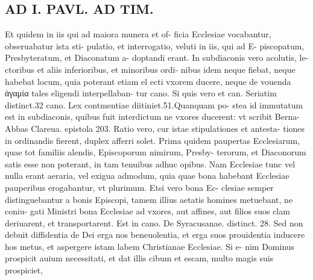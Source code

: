 \documentclass{article}
\begin{document}
\begin{pages}
\section*{AD I. PAVL. AD TIM. }
\marginpar{[ p.114 ]}\pstart Et quidem in iis qui ad maiora munera et of- ficia Ecclesiae vocabantur, obseruabatur ista sti- pulatio, et interrogatio, veluti in iis, qui ad E- piscopatum, Presbyteratum, et Diaconatum a- doptandi erant. In subdiaconis vero acolutis, le- ctoribus et aliis inferioribus, et minoribus ordi- nibus idem neque fiebat, neque habebat locum, quia poterant etiam el ecti vxorem ducere, neque de vouenda ἀγαμία tales eligendi interpellaban- tur cano. Si quis vero et can. Seriatim distinct.32 cano. Lex contmentiae diitiniet.51.Quanquam po- stea id immutatum est in subdiaconis, quibus fuit interdictum ne vxores ducerent: vt scribit Berna- Abbas Clareua. epistola 203.  \pend\pstart Ratio vero, cur istae stipulationes et antesta- tiones in ordinandis fierent, duplex afferri solet. Prima quidem paupertas Ecclesiarum, quae tot familiis alendis, Episcoporum nimirum, Presby- terorum, et Diaconorum satis esse non poterant, in tam tenuibus adhuc opibus. Nam Ecclesiae tunc vel nulla erant aeraria, vel exigua admodum, quia quae bona habebant Ecclesiae pauperibus erogabantur, vt plurimum. Etsi vero bona Ec- clesiae semper distinguebantur a bonis Episcopi, tamem illius aetatis homines metuebant, ne coniu- gati Ministri bona Ecclesiae ad vxores, aut affines, aut filios suos clam deriuarent, et transportarent. Est in cano. De Syracusanae. distinct. 28. Sed non debuit diffidentia de Dei erga nos beneuolentia, et erga suos prouidentia inducere hos metus, et aspergere istam labem Christianae Ecclesiae. Si e- nim Dominus prospicit auium necessitati, et dat illis cibum et escam, multo magis suis prospiciet,  \pend

\end{pages}
\end{document}
